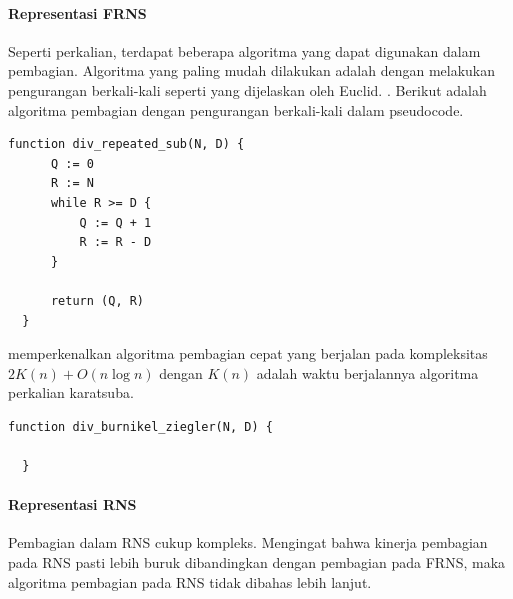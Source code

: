 \paragraph{Representasi FRNS}
Seperti perkalian, terdapat beberapa algoritma yang dapat digunakan dalam pembagian. Algoritma yang paling mudah dilakukan adalah dengan melakukan pengurangan berkali-kali seperti yang dijelaskan oleh Euclid. . Berikut adalah algoritma pembagian dengan pengurangan berkali-kali dalam pseudocode.

\begin{lstlisting}[basicstyle=\linespread{1.25}\footnotesize\rmfamily]
  function div_repeated_sub(N, D) {
      Q := 0
      R := N
      while R >= D {
          Q := Q + 1
          R := R - D
      }

      return (Q, R)
  }
\end{lstlisting}

\citet{div_burnikel_ziegler} memperkenalkan algoritma pembagian cepat yang berjalan pada kompleksitas $2K(n)+O(n \log n)$ dengan $K(n)$ adalah waktu berjalannya algoritma perkalian karatsuba.

\begin{lstlisting}[basicstyle=\linespread{1.25}\footnotesize\rmfamily]
  function div_burnikel_ziegler(N, D) {

  }
\end{lstlisting}

\paragraph{Representasi RNS}

Pembagian dalam RNS cukup kompleks. Mengingat bahwa kinerja pembagian pada RNS pasti lebih buruk dibandingkan dengan pembagian pada FRNS, maka algoritma pembagian pada RNS tidak dibahas lebih lanjut.
